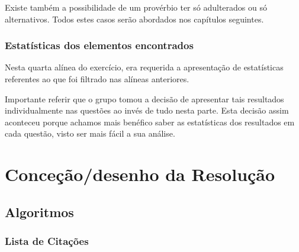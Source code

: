\documentclass[11pt,a4paper]{report}
\begin{document}
\vspace{0.2cm}

Existe também a possibilidade de um provérbio ter só adulterados ou só alternativos. Todos estes casos serão abordados nos capítulos seguintes.

\subsection{Estatísticas dos elementos encontrados}

Nesta quarta alínea do exercício, era requerida a apresentação de estatísticas referentes ao que foi filtrado nas alíneas anteriores.

Importante referir que o grupo tomou a decisão de apresentar tais resultados individualmente nas questões ao invés de tudo nesta parte. Esta decisão assim aconteceu porque achamos mais benéfico saber as estatísticas dos resultados em cada questão, visto ser mais fácil a sua análise.





\chapter{Conceção/desenho da Resolução}
\label{chap:concecao}

\section{Algoritmos}
\subsection{Lista de Citações}
\end{document}
